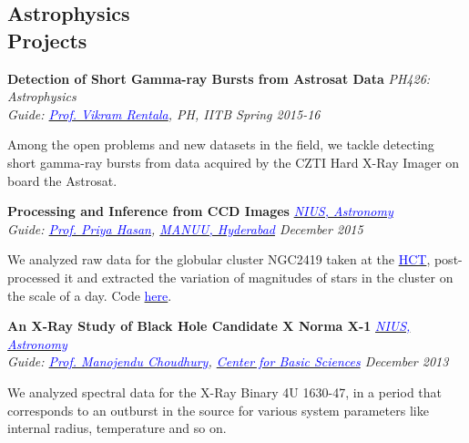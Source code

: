 \documentclass[margin,line]{res}
\newenvironment{list1}{
  \begin{list}{\ding{113}}{%
      \setlength{\itemsep}{0in}
      \setlength{\parsep}{0in} \setlength{\parskip}{0in}
      \setlength{\topsep}{0in} \setlength{\partopsep}{0in} 
      \setlength{\leftmargin}{0.17in}}}{\end{list}}
\begin{document}
\begin{resume}
\section{\sc Astrophysics \\Projects}
{\bf Detection of Short Gamma-ray Bursts from Astrosat Data} \hfill \textit{PH426: Astrophysics} \\
{\em Guide: \href{https://sites.google.com/site/vikramrentalahome/}{\textcolor{blue}{Prof. Vikram Rentala}}, \textit{PH, IITB} \hfill Spring 2015-16} \\
\vspace*{-.15in}
\begin{list1}
\item[] Among the open problems and new datasets in the field, we tackle detecting short gamma-ray bursts from data acquired by the CZTI Hard X-Ray Imager on board the Astrosat.
\end{list1}

\vspace*{-0.13in}

{\bf Processing and Inference from CCD Images} \hfill \textit{\href{http://nius.hbcse.tifr.res.in/}{\textcolor{blue} {NIUS, Astronomy}}} \\
{\em Guide: \href{http://http://manuu.ac.in/deptphysc_faclty.php/}{\textcolor{blue}{Prof. Priya Hasan}}, \href{http://manuu.ac.in/}{\textcolor{blue} {MANUU, Hyderabad}} \hfill December 2015} \\
\vspace*{-.15in}
\begin{list1}
\item[] We analyzed raw data for the globular cluster NGC2419 taken at the \href{http://www.iiap.res.in/iao/cycle.html}{\textcolor{blue} {HCT}}, post-processed it and extracted the variation of magnitudes of stars in the cluster on the scale of a day. Code \href{hhttps://github.com/alankarkotwal/ngc2419-variables}{\textcolor{blue} {here}}.
\end{list1}

\vspace*{-0.13in}

{\bf An X-Ray Study of Black Hole Candidate X Norma X-1} \hfill \textit{\href{http://nius.hbcse.tifr.res.in/}{\textcolor{blue} {NIUS, Astronomy}}} \\
{\em Guide: \href{http://cbs.ac.in/people/visiting-scientists/manojendu-choudhury}{\textcolor{blue}{Prof. Manojendu Choudhury}}, \href{http://cbs.ac.in/}{\textcolor{blue} {Center for Basic Sciences}} \hfill December 2013} \\
\vspace*{-.15in}
\begin{list1}
\item[] We analyzed spectral data for the X-Ray Binary 4U 1630-47, in a period that corresponds to an outburst in the source for various system parameters like internal radius, temperature and so on.
\end{list1}


\end{resume}
\end{document}
